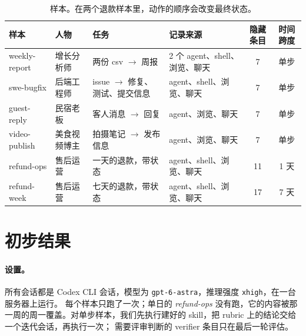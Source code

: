\documentclass[10pt,UTF8,scheme=plain]{ctexart}
\begin{document}
\begin{table}[h]
\centering\footnotesize\setlength{\tabcolsep}{4pt}
\begin{tabular}{@{}llllcc@{}}
\toprule
样本 & 人物 & 任务 & 记录来源 & 隐藏条目 & 时间跨度 \\
\midrule
weekly-report & 增长分析师 & 两份 csv $\rightarrow$ 周报 & 2 个 agent、shell、浏览、聊天 & 7 & 单步 \\
swe-bugfix & 后端工程师 & issue $\rightarrow$ 修复、测试、提交信息 & agent、shell、浏览、聊天 & 7 & 单步 \\
guest-reply & 民宿老板 & 客人消息 $\rightarrow$ 回复 & agent、浏览、聊天 & 7 & 单步 \\
video-publish & 美食视频博主 & 拍摄笔记 $\rightarrow$ 发布信息 & agent、浏览、聊天 & 7 & 单步 \\
refund-ops & 售后运营 & 一天的退款，带状态 & agent、shell、浏览、聊天 & 11 & 1 天 \\
refund-week & 售后运营 & 七天的退款，带状态 & agent、shell、浏览、聊天 & 17 & 7 天 \\
\bottomrule
\end{tabular}
\caption{样本。在两个退款样本里，动作的顺序会改变最终状态。}
\label{tab:samples}
\end{table}

\section{初步结果}
\label{sec:results}

\paragraph{设置。} 所有会话都是 Codex CLI 会话，模型为 \texttt{gpt-6-astra}，推理强度 \texttt{xhigh}，在一台服务器上运行。
每个样本只跑了一次；单日的 \emph{refund-ops} 没有跑，它的内容被那一周的周一覆盖。对单步样本，我们先执行建好的 skill，把 rubric 上的结论交给一个迭代会话，再执行一次；
需要评审判断的 verifier 条目只在最后一轮评估。
\end{document}
